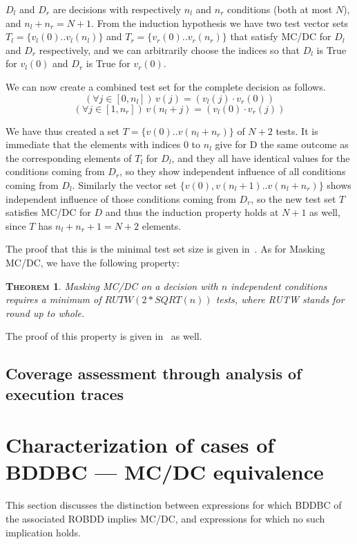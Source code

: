 \documentclass[a4paper,12pt,twoside]{article}
\newtheorem{theorem}{\textsc{Theorem}}
\begin{document}
$D_l$ and $D_r$ are decisions with respectively $n_l$ and $n_r$ conditions
(both at most $N$), and $n_l + n_r = N+1$. From the induction hypothesis
we have two test vector sets $T_l = \{ v_l (0) .. v_l (n_l) \}$ and
$T_r = \{ v_r (0) .. v_r (n_r) \}$ that satisfy MC/DC for $D_l$ and $D_r$
respectively, and we can arbitrarily choose the indices so that
$D_l$ is True for $v_l(0)$ and $D_r$ is True for $v_r (0)$.

We can now create a combined test set for the complete decision as follows.
$$(\forall j \in [0, n_l])\, v (j) = (v_l (j) \cdot v_r (0))$$
$$(\forall j \in [1, n_r])\, v (n_l + j) = (v_l (0) \cdot v_r (j))$$

We have thus created a set $T = \{ v(0) .. v(n_l + n_r) \}$ of $N+2$ tests.
It is immediate that the elements with indices 0 to $n_l$ give for D
the same outcome as the corresponding elements of $T_l$ for $D_l$,
and they all have identical values for the conditions coming from $D_r$,
so they show independent influence of all conditions coming from $D_l$.
Similarly the vector set $\{v(0), v(n_l+1) .. v(n_l + n_r)\}$ shows
independent influence of those conditions coming from $D_r$, so the new
test set $T$ satisfies MC/DC for $D$ and thus the induction property holds at
$N+1$ as well, since $T$ has $n_l + n_r + 1 = N+2$ elements.

The proof that this is the minimal test set size is given in~\cite{ar0118}.
As for Masking MC/DC, we have the following property:

\begin{theorem}
Masking MC/DC on a decision with $n$ independent conditions requires a
minimum of $RUTW(2*SQRT(n))$ tests, where RUTW stands for round up to
whole.
\end{theorem}

The proof of this property is given in~\cite{ar0118} as well.

\subsection{Coverage assessment through analysis of execution traces}


\section{Characterization of cases of BDDBC --- MC/DC equivalence}

This section discusses the distinction between expressions for which
BDDBC of the associated ROBDD implies MC/DC, and expressions for which
no such implication holds.
\end{document}

